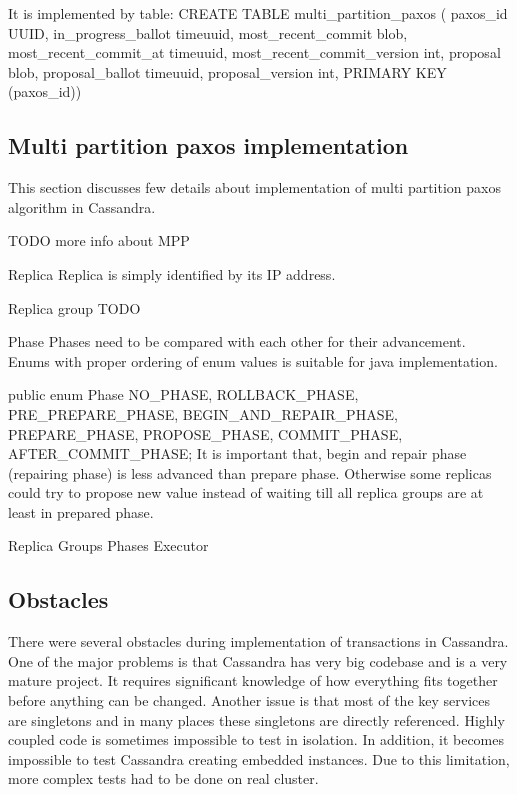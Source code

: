 It is implemented by table:
CREATE TABLE multi_partition_paxos (
paxos_id UUID,
in_progress_ballot timeuuid,
most_recent_commit blob,
most_recent_commit_at timeuuid,
most_recent_commit_version int,
proposal blob,
proposal_ballot timeuuid,
proposal_version int,
PRIMARY KEY (paxos_id))




\subsection{Multi partition paxos implementation}
This section discusses few details about implementation of multi partition paxos algorithm in Cassandra.


TODO more info about MPP


Replica
Replica is simply identified by its IP address. 


Replica group
TODO


Phase
Phases need to be compared with each other for their advancement. Enums with proper ordering of enum values is suitable for java implementation.


public enum Phase
{
   NO_PHASE,
   ROLLBACK_PHASE,
   PRE_PREPARE_PHASE,
   BEGIN_AND_REPAIR_PHASE,
   PREPARE_PHASE,
   PROPOSE_PHASE,
   COMMIT_PHASE,
   AFTER_COMMIT_PHASE;
}
It is important that, begin and repair phase (repairing phase) is less advanced than prepare phase. Otherwise some replicas could try to propose new value instead of waiting till all replica groups are at least in prepared phase.


Replica Groups Phases Executor




\subsection{Obstacles}
There were several obstacles during implementation of transactions in Cassandra. One of the major problems is that Cassandra has very big codebase and is a very mature project. It requires significant knowledge of how everything fits together before anything can be changed. 
Another issue is that most of the key services are singletons and in many places these singletons are directly referenced. Highly coupled code is sometimes impossible to test in isolation. In addition, it becomes impossible to test Cassandra creating embedded instances. Due to this limitation, more complex tests had to be done on real cluster.


